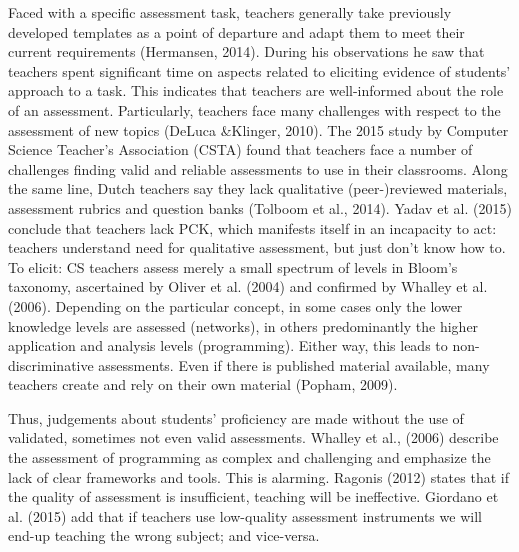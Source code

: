 
Faced with a specific assessment task, teachers generally take previously developed templates as a point of departure and adapt them to meet their current requirements (Hermansen, 2014). During his observations he saw that teachers spent significant time on aspects related to eliciting evidence of students' approach to a task. This indicates that teachers are well-informed about the role of an assessment.
Particularly, teachers face many challenges with respect to the assessment of new topics (DeLuca \&Klinger, 2010). The 2015 study by Computer Science Teacher's Association (CSTA) found that teachers face a number of challenges finding valid and reliable assessments to use in their classrooms. Along the same line, Dutch teachers say they lack qualitative (peer-)reviewed materials, assessment rubrics and question banks (Tolboom et al., 2014). Yadav et al. (2015) conclude that teachers lack PCK, which manifests itself in an incapacity to act: teachers understand need for qualitative assessment, but just don't know how to. To elicit: CS teachers assess merely a small spectrum of levels in Bloom's taxonomy, ascertained by Oliver et al. (2004) and confirmed by Whalley et al. (2006). Depending on the particular concept, in some cases only the lower knowledge levels are assessed (networks), in others predominantly the higher application and analysis levels (programming). Either way, this leads to non-discriminative assessments. Even if there is published material available, many teachers create and rely on their own material (Popham, 2009).

Thus, judgements about students' proficiency are made without the use of validated, sometimes not even valid assessments. Whalley et al., (2006) describe the assessment of programming as complex and challenging and emphasize the lack of clear frameworks and tools. This is alarming. Ragonis (2012) states that if the quality of assessment is insufficient, teaching will be ineffective.  Giordano et al. (2015) add that if teachers use low-quality assessment instruments we will end-up teaching the wrong subject; and vice-versa.






